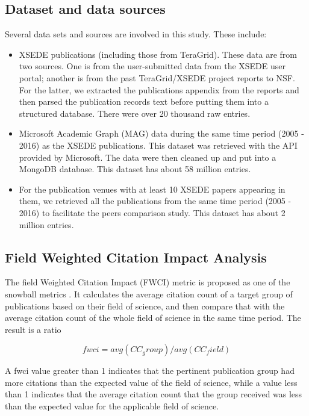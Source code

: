 \documentclass{sig-alternate}
\begin{document}
\subsection{Dataset and data sources}

Several data sets and sources are involved in this study. These include:

\begin{itemize}
    \item XSEDE publications (including those from TeraGrid). These data are from
two sources. One is from the user-submitted data from the XSEDE user portal; another
is from the past TeraGrid/XSEDE project reports to NSF. For the latter, we extracted the publications
appendix from the reports and then parsed the publication records text before putting
them into a structured database. There were over 20 thousand raw entries.
    \item Microsoft Academic Graph (MAG) data during the same time period (2005 - 2016) as the XSEDE
publications. This dataset was retrieved with the API provided by Microsoft. The data were
then cleaned up and put into a MongoDB database. This dataset has about 58 million entries.
    \item For the publication venues with at least 10 XSEDE papers appearing in them, we retrieved
all the publications from the same time period (2005 - 2016) to facilitate the peers
comparison study. This dataset has about 2 million entries.
\end{itemize}

\subsection{Field Weighted Citation Impact Analysis}

The field Weighted Citation Impact (FWCI) metric is proposed as one of the
snowball metrics \cite{colledge2014snowball}. It calculates the average
citation count of a target group of publications based on their field of
science, and then compare that with the average citation count of the whole
field of science in the same time period. The result is a ratio

\[	fwci = avg(CC_group)/avg(CC_field) \]

A fwci value greater than 1 indicates that the pertinent publication group had more
citations than the expected value of the field of science, while a value
less than 1 indicates that the average citation count that the group received was less than the expected
value for the applicable field of science.
\end{document}
